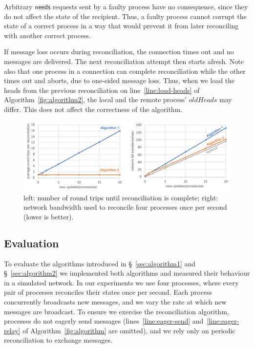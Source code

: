 \documentclass[a4paper,anonymous,USenglish]{lipics-v2019}
\begin{document}
Arbitrary $\mathsf{needs}$ requests sent by a faulty process have no consequence, since they do not affect the state of the recipient.
Thus, a faulty process cannot corrupt the state of a correct process in a way that would prevent it from later reconciling with another correct process.

If message loss occurs during reconciliation, the connection times out and no messages are delivered.
The next reconciliation attempt then starts afresh.
Note also that one process in a connection can complete reconciliation while the other times out and aborts, due to one-sided message loss.
Thus, when we load the heads from the previous reconciliation on line~\ref{line:load-heads} of Algorithm~\ref{fig:algorithm2}, the local and the remote process' $\mathit{oldHeads}$ may differ.
This does not affect the correctness of the algorithm.

\begin{figure}
  \includegraphics[width=\textwidth,keepaspectratio=true]{figs/evaluation.pdf}
  \caption{left: number of round trips until reconciliation is complete; right: network bandwidth used to reconcile four processes once per second (lower is better).}
  \label{fig:evaluation}
\end{figure}

\subsection{Evaluation}\label{sec:evaluation}

To evaluate the algorithms introduced in \S~\ref{sec:algorithm1} and \S~\ref{sec:algorithm2} we implemented both algorithms and measured their behaviour in a simulated network.
In our experiments we use four processes, where every pair of processes reconciles their states once per second.
Each process concurrently broadcasts new messages, and we vary the rate at which new messages are broadcast.
To ensure we exercise the reconciliation algorithm, processes do not eagerly send messages (lines~\ref{line:eager-send} and~\ref{line:eager-relay} of Algorithm~\ref{fig:algorithm} are omitted), and we rely only on periodic reconciliation to exchange messages.
\end{document}

